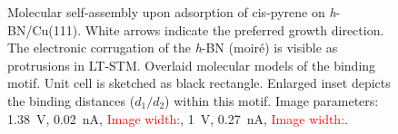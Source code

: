 \begin{figure}[] \centering
	\caption{Molecular self-assembly upon adsorption of cis-pyrene on \textit{h}-BN/Cu(111). White arrows indicate the preferred growth direction.  The electronic corrugation of the \textit{h}-BN (moir\'e) is visible as protrusions in LT-STM.  Overlaid molecular models of the binding motif. Unit cell is sketched as black rectangle. Enlarged inset depicts the binding distances ($d_1/d_2$) within this motif. Image parameters:  \SI{1.38}{\volt}, \SI{0.02}{\nano \ampere}, \textcolor{red}{Image width:},  \SI{1}{\volt}, \SI{0.27}{\nano \ampere}, \textcolor{red}{Image width:}.
	}
	\label{fig:pyrene-fig7}
\end{figure}

